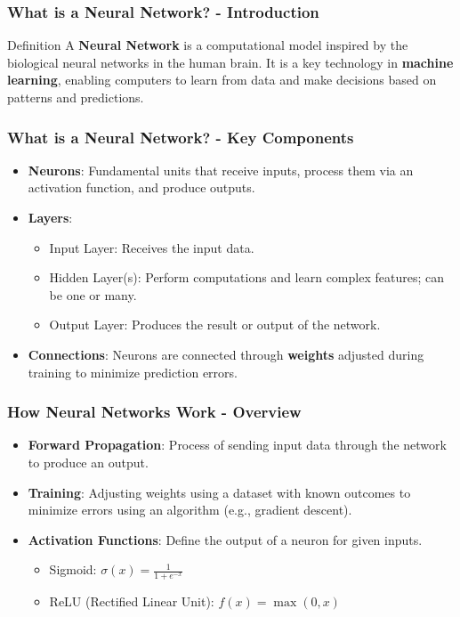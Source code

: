 \documentclass[aspectratio=169]{beamer}
\begin{document}
\begin{frame}[fragile]
    \frametitle{What is a Neural Network? - Introduction}
    \begin{block}{Definition}
        A \textbf{Neural Network} is a computational model inspired by the biological neural networks in the human brain. It is a key technology in \textbf{machine learning}, enabling computers to learn from data and make decisions based on patterns and predictions.
    \end{block}
\end{frame}

\begin{frame}[fragile]
    \frametitle{What is a Neural Network? - Key Components}
    \begin{itemize}
        \item \textbf{Neurons}: Fundamental units that receive inputs, process them via an activation function, and produce outputs.
        \item \textbf{Layers}: 
        \begin{itemize}
            \item Input Layer: Receives the input data.
            \item Hidden Layer(s): Perform computations and learn complex features; can be one or many.
            \item Output Layer: Produces the result or output of the network.
        \end{itemize}
        \item \textbf{Connections}: Neurons are connected through \textbf{weights} adjusted during training to minimize prediction errors.
    \end{itemize}
\end{frame}

\begin{frame}[fragile]
    \frametitle{How Neural Networks Work - Overview}
    \begin{itemize}
        \item \textbf{Forward Propagation}: Process of sending input data through the network to produce an output.
        \item \textbf{Training}: Adjusting weights using a dataset with known outcomes to minimize errors using an algorithm (e.g., gradient descent).
        \item \textbf{Activation Functions}: Define the output of a neuron for given inputs.
        \begin{itemize}
            \item Sigmoid: \( \sigma(x) = \frac{1}{1 + e^{-x}} \)
            \item ReLU (Rectified Linear Unit): \( f(x) = \max(0, x) \)
        \end{itemize}
    \end{itemize}
\end{frame}
\end{document}
